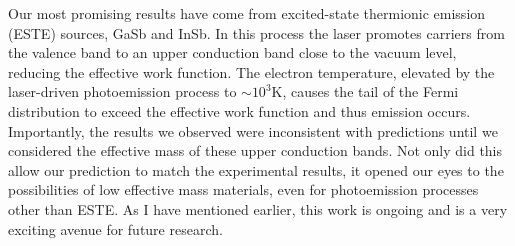 Our most promising results have come from excited-state thermionic emission (ESTE) sources, GaSb and InSb.
In this process the laser promotes carriers from the valence band to an upper conduction band close to the vacuum level, reducing the effective work function.
The electron temperature, elevated by the laser-driven photoemission process to $\sim10^3$K, causes the tail of the Fermi distribution to exceed the effective work function and thus emission occurs.
Importantly, the results we observed were inconsistent with predictions until we considered the effective mass of these upper conduction bands.
Not only did this allow our prediction to match the experimental results, it opened our eyes to the possibilities of low effective mass materials, even for photoemission processes other than ESTE.
As I have mentioned earlier, this work is ongoing and is a very exciting avenue for future research.


